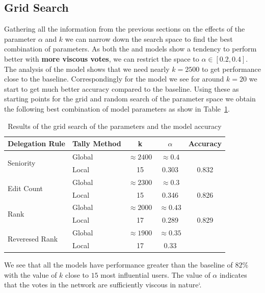 \subsection{Grid Search}
Gathering all the information from the previous sections on the effects of the parameter $\alpha$ and $k$ we can narrow down the search space to find the best combination of parameters. As both the \localv and \globalv models show a tendency to perform better with \textbf{more viscous votes}, we can restrict the space to $\alpha \in [0.2,0.4]$. The analysis of the \globalv model shows that we need nearly $k=2500$ to get performance close to the baseline. Correspondingly for the \localv model we see for around $k=20$ we start to get much better accuracy compared to the baseline. Using these as starting points for the grid and random search of the parameter space we obtain the following best combination of model parameters as show in Table~\ref{tab:grid-search}.
\begin{table}
    \centering
    \begin{tabular}{@{\extracolsep{\fill}}llccc}
        \toprule
        Delegation Rule & Tally Method & k & $\alpha$ & Accuracy \\ \midrule
        \multirow{2}{*}{Seniority} & Global & $\approx 2400$ & $\approx 0.4$ &   \\ 
        \cmidrule{2-5}
        & Local & 15 & 0.303& 0.832  \\
        \midrule
        \multirow{2}{*}{Edit Count} & Global & $\approx 2300$ & $\approx 0.3$ & \\
        \cmidrule{2-5}
        & Local & 15 & 0.346 & 0.826 \\
        \midrule
        \multirow{2}{*}{Rank} & Global & $\approx 2000$ & $\approx 0.43$  \\
        \cmidrule{2-5}
        & Local & 17 & 0.289 & 0.829  \\
        \midrule
        \multirow{2}{*}{Reveresed Rank} & Global & $\approx 1900$ & $\approx 0.35$  \\
        \cmidrule{2-5}
        & Local & 17 & 0.33 &  \\
        \bottomrule
        \end{tabular}
        \caption{Results of the grid search of the parameters and the model accuracy}
        \label{tab:grid-search}
\end{table}

We see that all the \localv models have performance greater than the baseline of $82\%$ with the value of $k$ close to $15$ most influential users. The value of $\alpha$ indicates that the votes in the network are sufficiently viscous in nature`. 